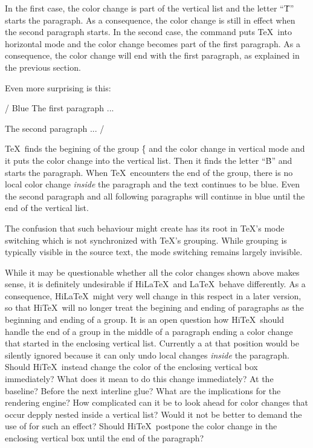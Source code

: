 In the first case, the color change is part of the vertical list
and the letter ``\.T'' starts the paragraph. 
As a consequence, the color change is still in effect when the second
paragraph starts.
In the second case, the  command puts \TeX\ into horizontal mode
and the color change becomes part of the first paragraph.
As a consequence, the color change will end with the first paragraph, as explained
in the previous section.

Even more surprising is this:
\medskip
{\parskip=0pt
\verbatim/{\color{blue} Blue} The first paragraph ...

The second paragraph ...
/}
\medskip


\TeX\ finds the begining of the group \.{\{} and the color change in vertical mode
and it puts the color change into the vertical list. Then it finds the letter
``\.B'' and starts the paragraph. When \TeX\ encounters the end of the group,
there is no local color change {\it inside} the paragraph and the text
continues to be blue. Even the second paragraph and all following paragraphs
will continue in blue until the end of the vertical list.

The confusion that such behaviour might create has its root in \TeX's
mode switching which is not synchronized with \TeX's grouping.
While grouping is typically visible in the source text, the mode
switching remains largely invisible. 


\bigskip{}\par\smallskip\noindent
While it may be questionable whether all the color changes shown above
makes sense, it is definitely undesirable if Hi\LaTeX\ and \LaTeX\
behave differently.
As a consequence,  Hi\LaTeX\ might very well change in this respect in a
later version, so that  Hi\TeX\ will no longer treat the begining
and ending of paragraphs as the beginning and ending of a group.
It is an open question how Hi\TeX\ should handle the end of a group
in the middle of a paragraph ending a color change that started in
the enclosing vertical list. Currently a \ctl{HINTendcolor} at that
position would be silently ignored because it can only undo local
changes {\it inside} the paragraph. Should Hi\TeX\ instead change the color
of the enclosing vertical box immediately? What does
it mean to do this change immediately? At the baseline?
Before the next interline glue? What are the implications for the
rendering engine? How complicated can it be to look ahead
for color changes that occur depply nested inside a vertical list?
Would it not be better to demand the use of \ctl{vadjust} for such an effect?
Should Hi\TeX\ postpone the color change in the enclosing vertical
box until the end of the paragraph?

